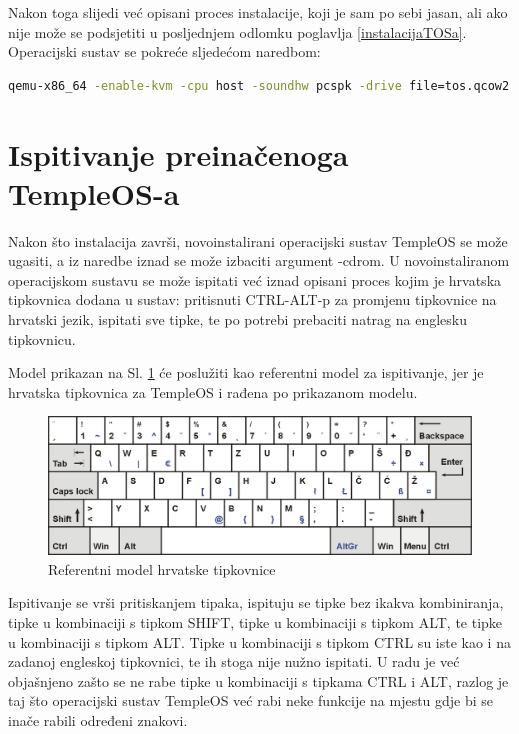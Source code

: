 \documentclass{foi}
\begin{document}
Nakon toga slijedi već opisani proces instalacije, koji je sam po sebi jasan, ali ako nije može se podsjetiti u posljednjem odlomku poglavlja \ref{instalacijaTOSa}. Operacijski sustav se pokreće sljedećom naredbom:

\begin{lstlisting}[language=sh,caption={Pokretanje virtualnoga stroja QEMU preko naredbenoga retka},captionpos=b]
qemu-x86_64 -enable-kvm -cpu host -soundhw pcspk -drive file=tos.qcow2 -m 2G
\end{lstlisting}

\section{Ispitivanje preinačenoga TempleOS-a}

Nakon što instalacija završi, novoinstalirani operacijski sustav TempleOS se može ugasiti, a iz naredbe iznad se može izbaciti argument {\selectfont -cdrom}. U novoinstaliranom operacijskom sustavu se može ispitati već iznad opisani proces kojim je hrvatska tipkovnica dodana u sustav: pritisnuti {\selectfont CTRL-ALT-p} za promjenu tipkovnice na hrvatski jezik, ispitati sve tipke, te po potrebi prebaciti natrag na englesku tipkovnicu.

Model prikazan na Sl. \ref{fig:crokeyboardlayout} će poslužiti kao referentni model za ispitivanje, jer je hrvatska tipkovnica za TempleOS i rađena po prikazanom modelu.

\begin{figure}[H]
    \centering
    \includegraphics[width=1.0\textwidth]{slike/crokeyboardlayout.jpg}
	\captionsetup{justification=centering}
	\caption{Referentni model hrvatske tipkovnice}
    \label{fig:crokeyboardlayout}
\end{figure}

Ispitivanje se vrši pritiskanjem tipaka, ispituju se tipke bez ikakva kombiniranja, tipke u kombinaciji s tipkom {\selectfont SHIFT}, tipke u kombinaciji s tipkom {\selectfont ALT}, te tipke u kombinaciji s tipkom {\selectfont ALT}. Tipke u kombinaciji s tipkom {\selectfont CTRL} su iste kao i na zadanoj engleskoj tipkovnici, te ih stoga nije nužno ispitati. U radu je već objašnjeno zašto se ne rabe tipke u kombinaciji s tipkama {\selectfont CTRL} i {\selectfont ALT}, razlog je taj što operacijski sustav TempleOS već rabi neke funkcije na mjestu gdje bi se inače rabili određeni znakovi.
\end{document}
